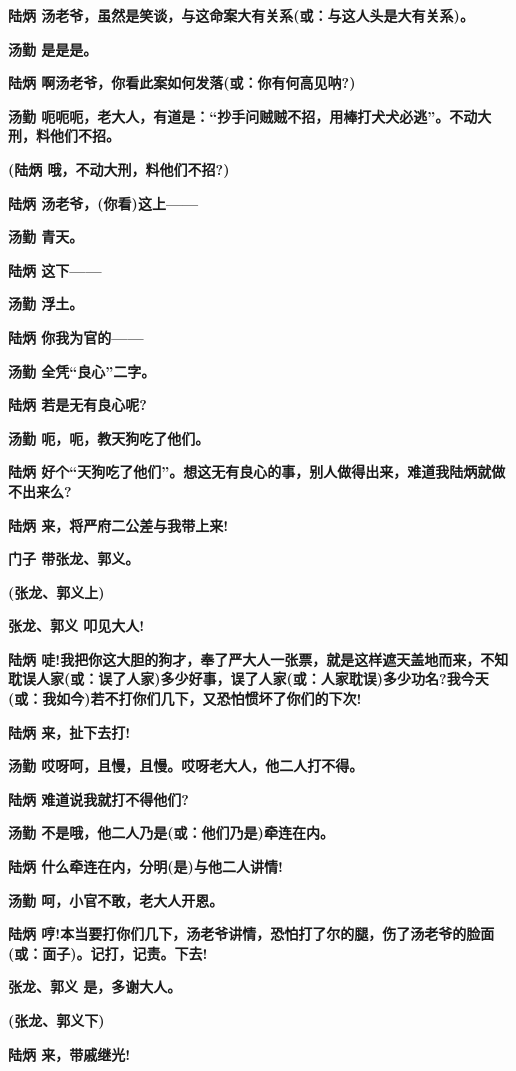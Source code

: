 \textbf{陆炳
汤老爷，虽然是笑谈，与这命案大有关系(或：与这人头是大有关系)。}

\textbf{汤勤 是是是。}

\textbf{陆炳 啊汤老爷，你看此案如何发落(或：你有何高见呐?)}

\textbf{汤勤
呃呃呃，老大人，有道是：``抄手问贼贼不招，用棒打犬犬必逃''。不动大刑，料他们不招。}

\textbf{(陆炳 哦，不动大刑，料他们不招?)}

\textbf{陆炳 汤老爷，(你看)这上------}

\textbf{汤勤 青天。}

\textbf{陆炳 这下------}

\textbf{汤勤 浮土。}

\textbf{陆炳 你我为官的------}

\textbf{汤勤 全凭``良心''二字。}

\textbf{陆炳 若是无有良心呢?}

\textbf{汤勤 呃，呃，教天狗吃了他们。}

\textbf{陆炳
好个``天狗吃了他们''。想这无有良心的事，别人做得出来，难道我陆炳就做不出来么?}

\textbf{陆炳 来，将严府二公差与我带上来!}

\textbf{门子 带张龙、郭义。}

\textbf{(张龙、郭义上)}

\textbf{张龙、郭义 叩见大人!}

\textbf{陆炳
唗!我把你这大胆的狗才，奉了严大人一张票，就是这样遮天盖地而来，不知耽误人家(或：误了人家)多少好事，误了人家(或：人家耽误)多少功名?我今天(或：我如今)若不打你们几下，又恐怕惯坏了你们的下次!}

\textbf{陆炳 来，扯下去打!}

\textbf{汤勤 哎呀呵，且慢，且慢。哎呀老大人，他二人打不得。}

\textbf{陆炳 难道说我就打不得他们?}

\textbf{汤勤 不是哦，他二人乃是(或：他们乃是)牵连在内。}

\textbf{陆炳 什么牵连在内，分明(是)与他二人讲情!}

\textbf{汤勤 呵，小官不敢，老大人开恩。}

\textbf{陆炳
哼!本当要打你们几下，汤老爷讲情，恐怕打了尔的腿，伤了汤老爷的脸面(或：面子)。记打，记责。下去!}

\textbf{张龙、郭义 是，多谢大人。}

\textbf{(张龙、郭义下)}

\textbf{陆炳 来，带戚继光!}

